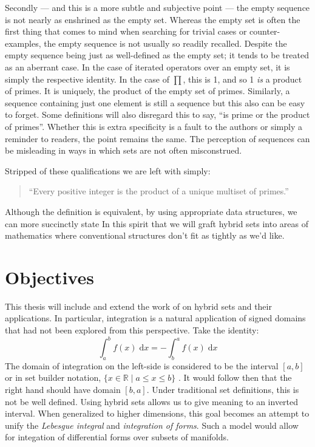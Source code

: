 Secondly --- and this is a more subtle and subjective point --- 
the empty sequence is not nearly as enshrined as the empty set.
Whereas the empty set is often the first thing that comes to mind when searching for trivial cases or counter-examples,
the empty sequence is not usually so readily recalled.
Despite the empty sequence being just as well-defined as the empty set; it tends to be treated as an aberrant case.
In the case of iterated operators over an empty set, it is simply the respective identity.
In the case of $\prod$, this is 1, and so 1 \emph{is} a product of primes.
It is uniquely, the product of the empty set of primes.
Similarly, a sequence containing just one element is still a sequence but this also can be easy to forget.
Some definitions will also disregard this to say, ``is prime or the product of primes''. 
Whether this is extra specificity is a fault to the authors or simply a reminder to readers, the point remains the same.
The perception of sequences can be misleading in ways in which sets are not often misconstrued.



Stripped of these qualifications we are left with simply:
\begin{quote}
``Every positive integer is the product of a unique multiset of primes.''
\end{quote}
Although the definition is equivalent, by using appropriate data structures, we can more succinctly state
In this spirit that we will graft hybrid sets into areas of mathematics where conventional structures don't fit as tightly as we'd like.
		
																							
\section{Objectives}



This thesis will include and extend the work of \cite{carette2010} on hybrid sets and their applications.
In particular, integration is a natural application of signed domains that had not been explored from this perspective.
Take the identity:
\begin{equation}
\int_a^b f(x) \;\mathrm{d}x = -\int_b^a f(x) \;\mathrm{d}x
\end{equation}
The domain of integration on the left-side is considered to be the interval $[a,b]$ or in set builder notation, 
$\{ x \in \mathbb{R} \; | \; a \leq x \leq b \}$ .
It would follow then that the right hand should have domain $[b,a]$.
Under traditional set definitions, this is not be well defined.
Using hybrid sets allows us to give meaning to an inverted interval.
When generalized to higher dimensions, this goal becomes an attempt to unify the \emph{Lebesgue integral} and \emph{integration of forms}.
Such a model would allow for integation of differential forms over subsets of manifolds.






